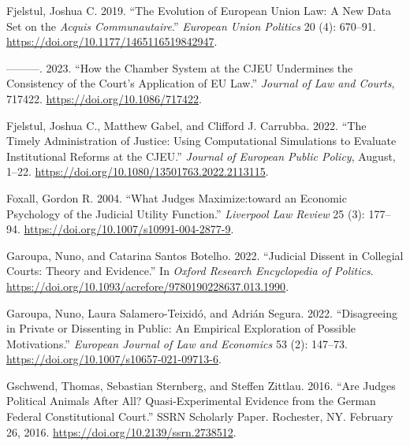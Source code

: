 \documentclass[
  11pt,
]{article}
\newlength{\cslhangindent}
\newenvironment{CSLReferences}[2] %
 {%
  \setlength{\parindent}{0pt}
  \ifodd #1 \everypar{\setlength{\hangindent}{\cslhangindent}}\ignorespaces\fi
  \ifnum #2 > 0
  \setlength{\parskip}{#2\baselineskip}
  \fi
 }%
 {}
\begin{document}
\begin{CSLReferences}{1}{0}
\leavevmode{}%
Fjelstul, Joshua C. 2019. {``The Evolution of {European Union} Law: {A}
New Data Set on the {\emph{Acquis Communautaire}}.''} \emph{European
Union Politics} 20 (4): 670--91.
\url{https://doi.org/10.1177/1465116519842947}.

\leavevmode{}%
---------. 2023. {``How the {Chamber System} at the {CJEU Undermines}
the {Consistency} of the {Court}'s {Application} of {EU Law}.''}
\emph{Journal of Law and Courts}, 717422.
\url{https://doi.org/10.1086/717422}.

\leavevmode{}%
Fjelstul, Joshua C., Matthew Gabel, and Clifford J. Carrubba. 2022.
{``The Timely Administration of Justice: Using Computational Simulations
to Evaluate Institutional Reforms at the {CJEU}.''} \emph{Journal of
European Public Policy}, August, 1--22.
\url{https://doi.org/10.1080/13501763.2022.2113115}.

\leavevmode{}%
Foxall, Gordon R. 2004. {``What Judges Maximize:toward an Economic
Psychology of the Judicial Utility Function.''} \emph{Liverpool Law
Review} 25 (3): 177--94.
\url{https://doi.org/10.1007/s10991-004-2877-9}.

\leavevmode{}%
Garoupa, Nuno, and Catarina Santos Botelho. 2022. {``Judicial {Dissent}
in {Collegial Courts}: {Theory} and {Evidence}.''} In \emph{Oxford
{Research Encyclopedia} of {Politics}}.
\url{https://doi.org/10.1093/acrefore/9780190228637.013.1990}.

\leavevmode{}%
Garoupa, Nuno, Laura Salamero-Teixidó, and Adrián Segura. 2022.
{``Disagreeing in Private or Dissenting in Public: An Empirical
Exploration of Possible Motivations.''} \emph{European Journal of Law
and Economics} 53 (2): 147--73.
\url{https://doi.org/10.1007/s10657-021-09713-6}.

\leavevmode{}%
Gschwend, Thomas, Sebastian Sternberg, and Steffen Zittlau. 2016. {``Are
{Judges Political Animals} After {All}? {Quasi-Experimental Evidence}
from the {German Federal Constitutional Court}.''} SSRN Scholarly Paper.
Rochester, NY. February 26, 2016.
\url{https://doi.org/10.2139/ssrn.2738512}.


\end{CSLReferences}
\end{document}
